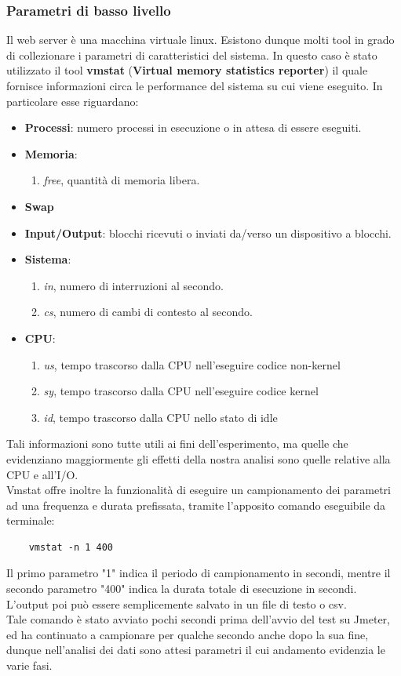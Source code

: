 \subsubsection{Parametri di basso livello}
Il web server è una macchina virtuale linux. Esistono dunque molti tool in grado di collezionare i parametri di caratteristici del sistema. In questo caso è stato utilizzato il tool \textbf{vmstat} (\textbf{Virtual memory statistics reporter}) il quale fornisce informazioni circa le performance del sistema su cui viene eseguito. In particolare esse riguardano:
\begin{itemize}
	\item \textbf{Processi}: numero processi in esecuzione o in attesa di essere eseguiti.
	\item \textbf{Memoria}:
		\begin{enumerate}
			\item \textit{free}, quantità di memoria libera.
		\end{enumerate}
	\item \textbf{Swap}
	\item \textbf{Input/Output}: blocchi ricevuti o inviati da/verso un dispositivo a blocchi.
	\item \textbf{Sistema}: 
		\begin{enumerate}
			\item \textit{in}, numero di interruzioni al secondo.
			\item \textit{cs}, numero di cambi di contesto al secondo.
		\end{enumerate}
	\item \textbf{CPU}: 
		\begin{enumerate}
			\item \textit{us}, tempo trascorso dalla CPU nell'eseguire codice non-kernel
			\item \textit{sy}, tempo trascorso dalla CPU nell'eseguire codice kernel
			\item \textit{id}, tempo trascorso dalla CPU nello stato di idle
		\end{enumerate}
\end{itemize}
Tali informazioni sono tutte utili ai fini dell'esperimento, ma quelle che evidenziano maggiormente gli effetti della nostra analisi sono quelle relative alla CPU e all'I/O.
\\
Vmstat offre inoltre la funzionalità di eseguire un campionamento dei parametri ad una frequenza e durata prefissata, tramite l'apposito comando eseguibile da terminale:
\begin{verbatim}
	vmstat -n 1 400
\end{verbatim}
Il primo parametro "1" indica il periodo di campionamento in secondi, mentre il secondo parametro "400" indica la durata totale di esecuzione in secondi. L'output poi può essere semplicemente salvato in un file di testo o csv.
\\
Tale comando è stato avviato pochi secondi prima dell'avvio del test su Jmeter, ed ha continuato a campionare per qualche secondo anche dopo la sua fine, dunque nell'analisi dei dati sono attesi parametri il cui andamento evidenzia le varie fasi.


